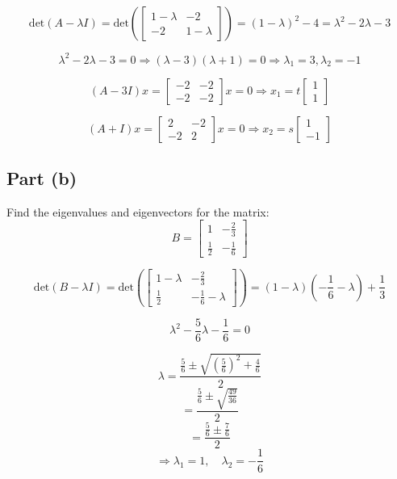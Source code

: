 \documentclass[12pt]{article}
\begin{document}
\[
  \text{det}(A - \lambda I) = \text{det}\left(\begin{bmatrix} 1-\lambda & -2 \\ -2 & 1-\lambda \end{bmatrix}\right) = (1-\lambda)^2 - 4 = \lambda^2 - 2\lambda - 3
\]

\[
  \lambda^2 - 2\lambda - 3 = 0 \Rightarrow (\lambda - 3)(\lambda + 1) = 0 \Rightarrow \lambda_1 = 3, \lambda_2 = -1
\]

\[
  (A - 3I)x = \begin{bmatrix} -2 & -2 \\ -2 & -2 \end{bmatrix}x = 0 \Rightarrow x_1 = t\begin{bmatrix} 1 \\ 1 \end{bmatrix}
\]

\[
  (A + I)x = \begin{bmatrix} 2 & -2 \\ -2 & 2 \end{bmatrix}x = 0 \Rightarrow x_2 = s\begin{bmatrix} 1 \\ -1 \end{bmatrix}
\]

\pagebreak

\subsection*{Part (b)}
Find the eigenvalues and eigenvectors for the matrix:
\[
B = \begin{bmatrix} 1 & -\frac{2}{3} \\ \frac{1}{2} & -\frac{1}{6} \end{bmatrix}
\]

\[
\text{det}(B - \lambda I) = \text{det}\left(\begin{bmatrix} 1-\lambda & -\frac{2}{3} \\ \frac{1}{2} & -\frac{1}{6}-\lambda \end{bmatrix}\right) = (1-\lambda)\left(-\frac{1}{6}-\lambda\right) + \frac{1}{3}
\]

\[
\lambda^2 - \frac{5}{6}\lambda - \frac{1}{6} = 0
\]

\[
\lambda = \frac{\frac{5}{6} \pm \sqrt{\left(\frac{5}{6}\right)^2 + \frac{4}{6}}}{2}
\]
\[
= \frac{\frac{5}{6} \pm \sqrt{\frac{49}{36}}}{2}
\]
\[
= \frac{\frac{5}{6} \pm \frac{7}{6}}{2}
\]
\[
\Rightarrow \lambda_1 = 1, \quad \lambda_2 = -\frac{1}{6}
\]
\end{document}
